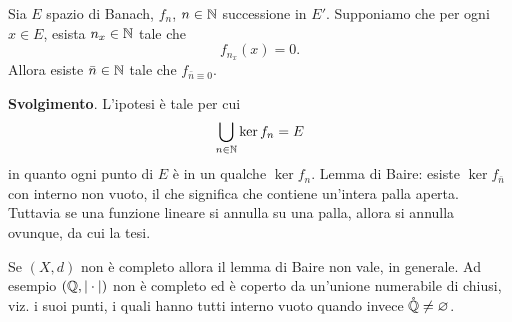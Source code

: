\begin{exercise}
\label{ex:ptwise_eventually_null_seq}
	Sia $E$ spazio di Banach, $f_n$, $n \in \mathbb{N}$ successione in $E'$. Supponiamo che per ogni $x \in E$, esista $n_x \in \mathbb{N}$ tale che
	\begin{equation*}
		f_{n_x}(x) = 0.
	\end{equation*}
	Allora esiste $\bar n \in \mathbb{N}$ tale che $f_{\bar n \equiv 0}$.

	\textbf{Svolgimento}. L'ipotesi è tale per cui
	\begin{equation*}
		\bigcup_{n \in \mathbb{N}} \ker f_n = E
	\end{equation*}
	in quanto ogni punto di $E$ è in un qualche $\ker f_n$. Lemma di Baire: esiste $\ker f_{\bar n}$ con interno non vuoto, il che significa che contiene un'intera palla aperta.
	Tuttavia se una funzione lineare si annulla su una palla, allora si annulla ovunque, da cui la tesi.
\end{exercise}

\begin{counterexample}
	Se $(X, d)$ non è completo allora il lemma di Baire non vale, in generale. Ad esempio $(\mathbb{Q}, |\cdot|)$ non è completo ed è coperto da un'unione numerabile di chiusi, viz. i suoi punti, i quali hanno tutti interno vuoto quando invece $\mathring{\mathbb{Q}} \neq \varnothing$.
\end{counterexample}

